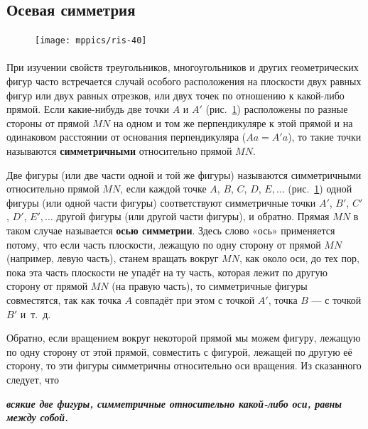\subsection*{Осевая симметрия}



\begin{figure}
\centering
\texttt{[image: mppics/ris-40]}
\caption{}\label{1938/ris-40}
\end{figure}

\paragraph{}\label{1938/37}
При изучении свойств треугольников, многоугольников и других геометрических фигур часто встречается случай особого расположения на плоскости двух равных фигур или двух равных отрезков, или двух точек по отношению к какой-либо прямой.
Если какие-нибудь две точки $A$ и $A'$ (рис.~\ref{1938/ris-40}) расположены по разные стороны от прямой $MN$ на одном и том же перпендикуляре к этой прямой и на одинаковом расстоянии от основания перпендикуляра ($Aa=A'a$), то такие точки называются \textbf{симметричными} относительно прямой $MN$.

Две фигуры (или две части одной и той же фигуры) называются симметричными относительно прямой $MN$, если каждой точке $A$, $B$, $C$, $D$, $E,\dots$
(рис.~\ref{1938/ris-40}) одной фигуры (или одной части фигуры) соответствуют симметричные точки $A'$, $B'$, $C'$, $D'$, $E',\dots$ другой фигуры (или другой части фигуры), и обратно.
Прямая $MN$ в таком случае называется \textbf{осью симметрии}. 
Здесь слово «ось» применяется потому, что если часть плоскости, лежащую по одну сторону от прямой $MN$ (например, левую часть), станем вращать вокруг $MN$, как около оси, до тех пор, пока эта часть плоскости не упадёт на ту часть, которая лежит по другую сторону от прямой $MN$ (на правую часть), то симметричные фигуры совместятся, так как точка $A$ совпадёт при этом с точкой $A'$, точка $B$ — с точкой $B'$ и~т.~д.

Обратно, если вращением вокруг некоторой прямой мы можем фигуру, лежащую по одну сторону от этой прямой, совместить с фигурой, лежащей по другую её сторону, то эти фигуры симметричны относительно оси вращения.
Из сказанного следует, что

\textbf{\emph{всякие две фигуры, симметричные относительно какой-либо оси, равны между собой.}}

